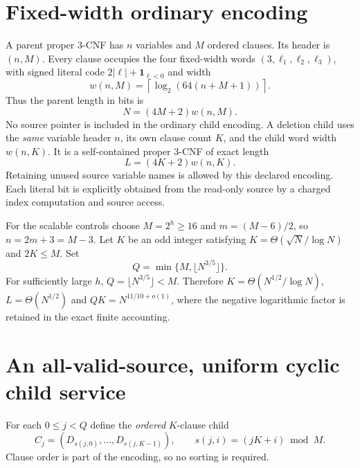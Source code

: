 \documentclass[11pt]{article}
\begin{document}
\section{Fixed-width ordinary encoding}
A parent proper 3-CNF has $n$ variables and $M$ ordered clauses.
Its header is $(n,M)$. Every clause occupies the four fixed-width
words $(3,\ell_1,\ell_2,\ell_3)$, with signed literal code
$2|\ell|+\mathbf{1}_{\ell<0}$ and width
\[
w(n,M)=\left\lceil\log_2(64(n+M+1))\right\rceil.
\]
Thus the parent length in bits is
\[
N=(4M+2)w(n,M).
\]
No source pointer is included in the ordinary child encoding.
A deletion child uses the \emph{same} variable header $n$,
its own clause count $K$, and the child word width $w(n,K)$.
It is a self-contained proper 3-CNF of exact length
\[
L=(4K+2)w(n,K).
\]
Retaining unused source variable names is allowed by this declared
encoding. Each literal bit is explicitly obtained from the read-only
source by a charged index computation and source access.

For the scalable controls choose $M=2^h\ge16$ and
$m=(M-6)/2$, so $n=2m+3=M-3$.
Let $K$ be an odd integer satisfying
$K=\Theta(\sqrt N/\log N)$ and $2K\le M$.
Set
\[
Q=\min\{M,\lfloor N^{3/5}\rfloor\}.
\]
For sufficiently large $h$, $Q=\lfloor N^{3/5}\rfloor<M$.
Therefore $K=\Theta(N^{1/2}/\log N)$,
$L=\Theta(N^{1/2})$ and $QK=N^{11/10+o(1)}$,
where the negative logarithmic factor is retained in the exact
finite accounting.

\section{An all-valid-source, uniform cyclic child service}
For each $0\le j<Q$ define the \emph{ordered} $K$-clause child
\[
C_j=(D_{s(j,0)},\ldots,D_{s(j,K-1)}),\qquad
s(j,i)=(jK+i)\bmod M.
\tag{1}
\]
Clause order is part of the encoding, so no sorting is required.
\end{document}

